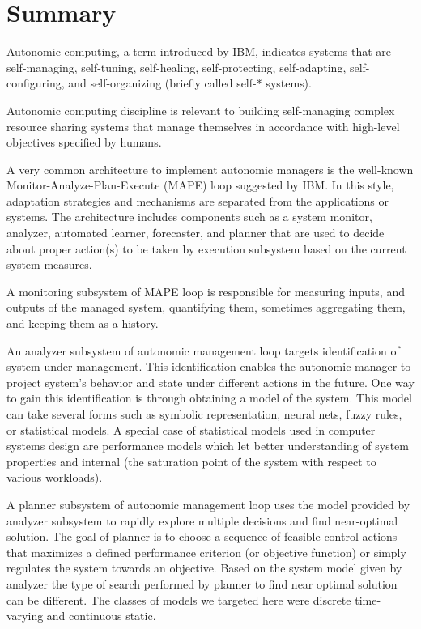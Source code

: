 \section{Summary}
Autonomic computing, a term introduced by IBM, indicates systems that are self-managing, self-tuning, self-healing, self-protecting, self-adapting, self-configuring, and self-organizing (briefly called self-* systems). 

Autonomic computing discipline is relevant to building self-managing complex resource sharing systems that manage themselves in accordance with high-level objectives specified by humans.

A very common architecture to implement autonomic managers is the well-known Monitor-Analyze-Plan-Execute (MAPE) loop suggested by IBM. In this style, adaptation strategies and mechanisms are separated from the applications or systems. The architecture includes components such as a system monitor, analyzer, automated learner, forecaster, and planner that are used to decide about proper action(s) to be taken by execution subsystem based on the current system measures.

 A monitoring subsystem of MAPE loop is responsible for measuring inputs, and outputs of the managed system, quantifying them, sometimes aggregating them, and keeping them as a history. 

 An analyzer subsystem of autonomic management loop targets identification of system under management. This identification enables the autonomic manager to project system's behavior and state under different actions in the future. One way to gain this identification is through obtaining a model of the system. This model can take several forms such as symbolic representation, neural nets, fuzzy rules, or statistical models.  
A special case of statistical models used in computer systems design are performance models which let better understanding of system properties and internal (the saturation point of the system with respect to various workloads). 

A planner subsystem of autonomic management loop uses the model provided by analyzer subsystem to rapidly explore multiple decisions and find near-optimal solution. The goal of planner is to choose a sequence of feasible control actions that maximizes a defined performance criterion (or objective function) or simply regulates the system towards an objective. 
Based on the system model given by analyzer the type of search performed by planner to find near optimal solution can be different. The classes of models we targeted here were discrete time-varying and continuous static. 

